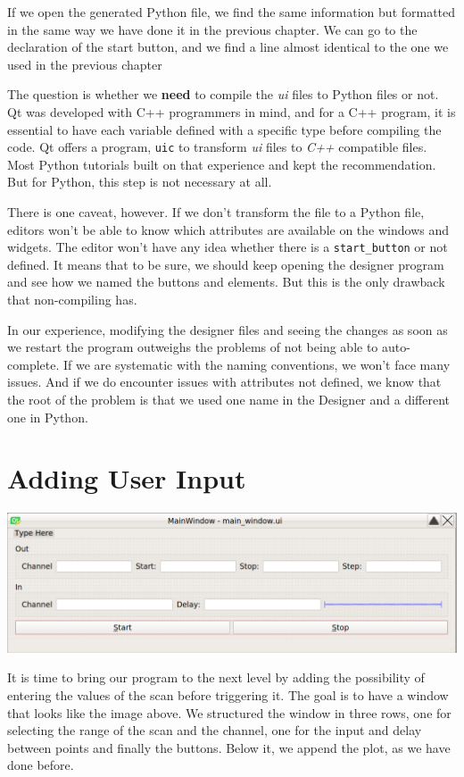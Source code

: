 If we open the generated Python file, we find the same information but formatted in the same way we have done it in the previous chapter. We can go to the declaration of the start button, and we find a line almost identical to the one we used in the previous chapter


The question is whether we \textbf{need} to compile the \emph{ui} files to Python files or not. Qt was developed with C++ programmers in mind, and for a C++ program, it is essential to have each variable defined with a specific type before compiling the code. Qt offers a program, \texttt{uic} to transform \emph{ui} files to \emph{C++} compatible files. Most Python tutorials built on that experience and kept the recommendation. But for Python, this step is not necessary at all.

There is one caveat, however. If we don't transform the file to a Python file, editors won't be able to know which attributes are available on the windows and widgets. The editor won't have any idea whether there is a \texttt{start\_button} or not defined. It means that to be sure, we should keep opening the designer program and see how we named the buttons and elements. But this is the only drawback that non-compiling has.

In our experience, modifying the designer files and seeing the changes as soon as we restart the program outweighs the problems of not being able to auto-complete. If we are systematic with the naming conventions, we won't face many issues. And if we do encounter issues with attributes not defined, we know that the root of the problem is that we used one name in the Designer and a different one in Python.

\section{Adding User Input}\label{sec:adding-user-input}
\begin{center}
    \includegraphics[width=.5\textwidth]{images/Chapter_09/08_final_window_example.png}
\end{center}

It is time to bring our program to the next level by adding the possibility of entering the values of the scan before triggering it. The goal is to have a window that looks like the image above. We structured the window in three rows, one for selecting the range of the scan and the channel, one for the input and delay between points and finally the buttons. Below it, we append the plot, as we have done before.

